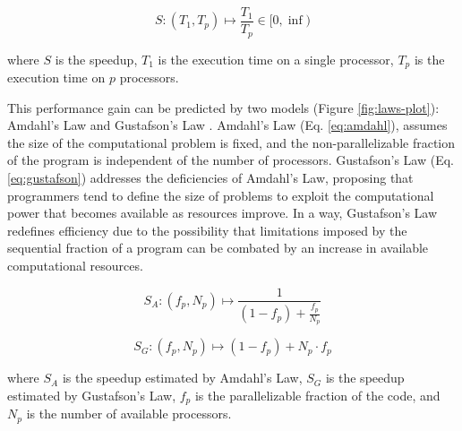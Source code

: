 \documentclass[Ingles]{phdthesis}
\begin{document}
\begin{equation}
  S \colon (T_1, T_p) \mapsto \frac{T_1}{T_p} \in [0,\inf)
  \label{eq:speedup}
\end{equation}

\noindent where \(S\) is the speedup, \(T_1\) is the execution time on a single processor, \(T_p\) is the execution time on \(p\) processors.

This performance gain can be predicted by two models (Figure \ref{fig:laws-plot}): Amdahl's Law \cite{amdahl1967} and Gustafson's Law \cite{gustafson1988}. Amdahl's Law (Eq. \ref{eq:amdahl}), assumes the size of the computational problem is fixed, and the non-parallelizable fraction of the program is independent of the number of processors. Gustafson's Law (Eq. \ref{eq:gustafson}) addresses the deficiencies of Amdahl's Law, proposing that programmers tend to define the size of problems to exploit the computational power that becomes available as resources improve. In a way, Gustafson's Law redefines efficiency due to the possibility that limitations imposed by the sequential fraction of a program can be combated by an increase in available computational resources.

\begin{equation}
  S_A \colon (f_p, N_p) \mapsto \frac{1}{(1 - f_p) + \frac{f_p}{N_p}}
  \label{eq:amdahl}
\end{equation}

\begin{equation}
  S_G \colon (f_p, N_p) \mapsto (1 - f_p) + N_p \cdot f_p
  \label{eq:gustafson}
\end{equation}

\noindent where \(S_A\) is the speedup estimated by Amdahl's Law, \(S_G\) is the speedup estimated by Gustafson's Law, \(f_p\) is the parallelizable fraction of the code, and \(N_p\) is the number of available processors.
\end{document}
